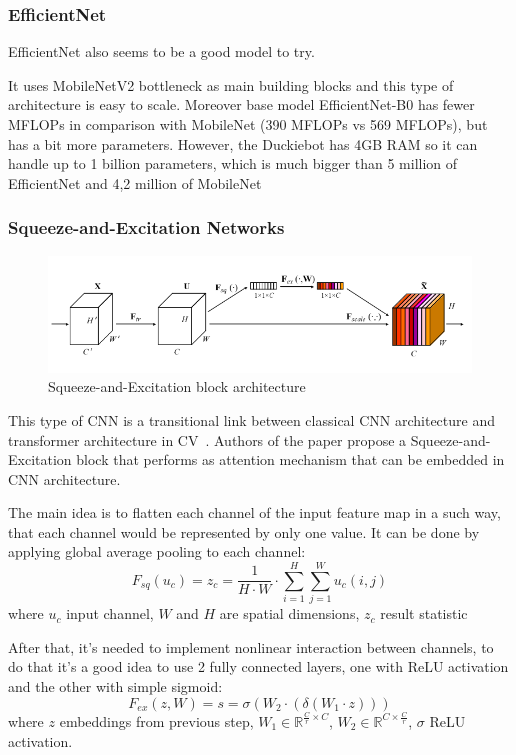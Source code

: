 \subsubsection{EfficientNet}
EfficientNet also seems to be a good model to try\cite{efficientnet}. 

It uses MobileNetV2\cite{mobile_netv2} bottleneck as main building blocks and this type of architecture
is easy to scale. Moreover base model EfficientNet-B0 has fewer MFLOPs in comparison 
with MobileNet (390 MFLOPs vs 569 MFLOPs), but has a bit more parameters. However, 
the Duckiebot has 4GB RAM so it can handle up to 1 billion parameters, which is much 
bigger than 5 million of EfficientNet and 4,2 million of MobileNet

\subsubsection{Squeeze-and-Excitation Networks}

\begin{figure}[ht]
    \includegraphics[scale=0.45]{src/BackgroundReading/assets/squeze_and_excitation.png}
    \caption{Squeeze-and-Excitation block architecture}\label{fig:squeze_and_excitation}
\end{figure}

This type of CNN is a transitional link between classical CNN architecture 
and transformer architecture in CV~\cite{transformers}.
Authors of the paper\cite{seNet} propose a Squeeze-and-Excitation block that performs as 
attention mechanism that can be embedded in CNN architecture.

The main idea is to flatten each channel of the input feature map in a such way, 
that each channel would be represented by only one value. It can be done by
applying global average pooling to each channel:
\[F_{sq}(u_c) = z_c = \frac{1}{H\cdot W} \cdot \sum\limits_{i=1}^H\sum\limits_{j=1}^W u_c(i,j)\]
where $u_c$ \- input channel, $W$ and $H$ are spatial dimensions, $z_c$ \- result statistic

After that, it's needed to implement nonlinear interaction between channels, to do that
it's a good idea to use 2 fully connected layers, one with ReLU activation and the other
with simple sigmoid:
\[F_{ex}(z,W)=s = \sigma (W_2\cdot (\delta(W_1\cdot z)))\] 
where $z$ embeddings from previous step, $W_1 \in \mathbb{R}^{\frac{C}{r}\times C}$, 
$W_2 \in \mathbb{R}^{C \times \frac{C}{r}}$, $\sigma$ \- ReLU activation.

